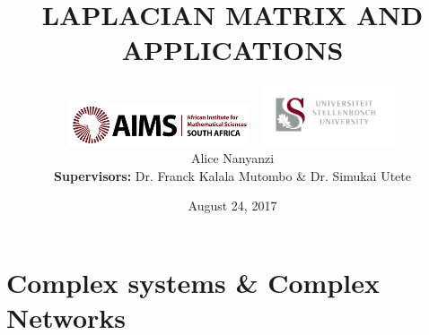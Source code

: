 \documentclass{beamer}
\title[Laplacian Matrix]{LAPLACIAN MATRIX AND APPLICATIONS} %
\author[Alice Nanyanzi] {\includegraphics[width=0.4\textwidth]{images/AIMSlogo.png}\hspace*{3.75cm}~%
	\includegraphics[width=0.3\textwidth]{images/su1.png} \\
	\vspace{0.75cm}
	Alice Nanyanzi \\
	\vspace{0.5cm}
	\textbf{Supervisors:} Dr. Franck Kalala Mutombo \& Dr. Simukai Utete
} %
\institute[AIMS-SU] %
{
\textit{alicenanyanzi@aims.ac.za} %
}
\date{August 24, 2017} %
\begin{document}
\begin{frame}
\titlepage %
\end{frame}

\begin{frame}
\frametitle{} %
\tableofcontents %
\end{frame}


\section{Complex systems \& Complex Networks} %

\end{document}
